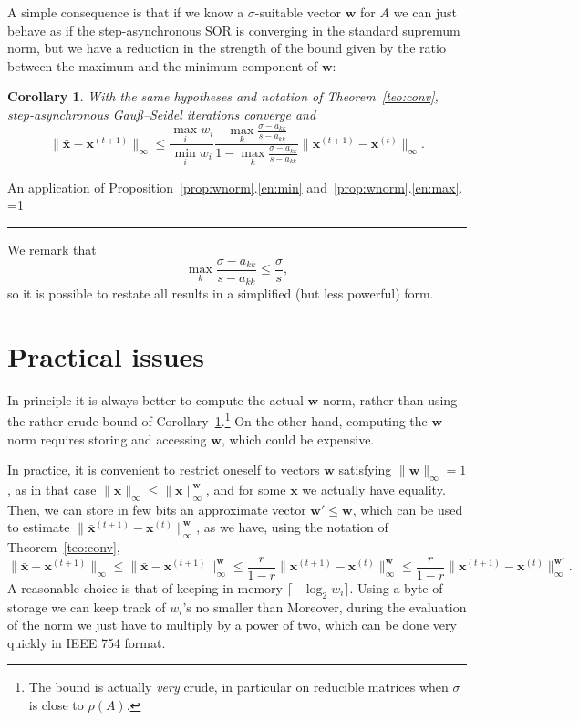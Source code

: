 \documentclass{article}
\newcommand{\w}{{\bm w}}
\newcommand{\x}{{\bm x}}
\newcommand{\Gauss}{Gau\ss}
\newcommand{\1}{\mathbf 1}
\newtheorem{corollary}{Corollary}
\newcounter{noqed}
\newcommand{\qed}{ \ifmmode\mbox{ }\fi\rule[-.05em]{.3em}{.7em}\setcounter{noqed}{0}}
\newenvironment{proof}[1][{}]{\noindent{\bf Proof#1. }\setcounter{noqed}{1}}{\ifnum\value{noqed}=1\qed\fi\par\medskip}
\begin{document}
A simple consequence is that if we know a $\sigma$-suitable vector $\w$ for
$A$ we can just behave as if the step-asynchronous SOR is converging in the
standard supremum norm, but we have a reduction in the strength 
of the bound given by the ratio between the maximum
and the minimum component of $\w$:
\begin{corollary}
\label{cor:bound}
With the same hypotheses and notation of Theorem~\ref{teo:conv}, step-asynchronous \Gauss--Seidel iterations converge and
\[
\bigl\|\bar\x - \x^{(t+1)}\bigr\|_\infty
\leq \frac{\max_i w_i}{\min_i
w_i}\frac{\displaystyle \max_k\frac{\sigma
-a_{kk}}{s-a_{kk}}}{\displaystyle 1-\max_k\frac{\sigma
-a_{kk}}{s-a_{kk}}}
\bigl\|\x^{(t+1)} - \x^{(t)}\bigr\|_\infty.
\]
\end{corollary}
\begin{proof}
An application of Proposition~\ref{prop:wnorm}.\ref{en:min}
and~\ref{prop:wnorm}.\ref{en:max}.
\end{proof}

We remark that 
\[\max_k\frac{\sigma
-a_{kk}}{s-a_{kk}}\leq \frac\sigma s,\]
so it is possible to restate all results in a simplified (but less powerful)
form.


\section{Practical issues}
In principle it is always better to compute the actual $\w$-norm,
rather than using the rather crude bound of Corollary~\ref{cor:bound}.\footnote{The bound is actually \emph{very} crude, in particular on
reducible matrices when $\sigma$ is close to $\rho(A)$.} On the other
hand, computing the $\w$-norm requires storing and accessing $\w$, which could be expensive. 

In practice, it is convenient to restrict oneself to vectors $\w$ satisfying $\|\w\|_\infty=1$, as in that case
$\|\x\|_\infty\leq\|\x\|_\infty^\w$, and for some $\x$ we actually have equality.
Then, we can store in few bits an approximate vector $\w'\leq \w$, which can be used 
to estimate $\bigl\|\bar\x^{(t+1)} - \x^{(t)}\bigr\|_\infty^\w$, as we have, using the notation of Theorem~\ref{teo:conv},
\[
\bigl\|\bar\x - \x^{(t+1)}\bigr\|_\infty\leq \bigl\|\bar\x - \x^{(t+1)}\bigr\|_\infty^\w\leq \frac r{1-r} \bigl\|\x^{(t+1)}
- \x^{(t)}\bigr\|_\infty^\w
\leq 
\frac r{1-r} \bigl\|\x^{(t+1)} -
\x^{(t)}\bigr\|_\infty^{\w'}.
\]
A reasonable choice is that of keeping in memory $\lceil -\log_2
w_i\rceil$. Using a byte of storage we can keep track of $w_i$'s no smaller than
Moreover, during the evaluation of the norm we just have to multiply by a power
of two, which can be done very quickly in IEEE 754 format.
\end{document}
